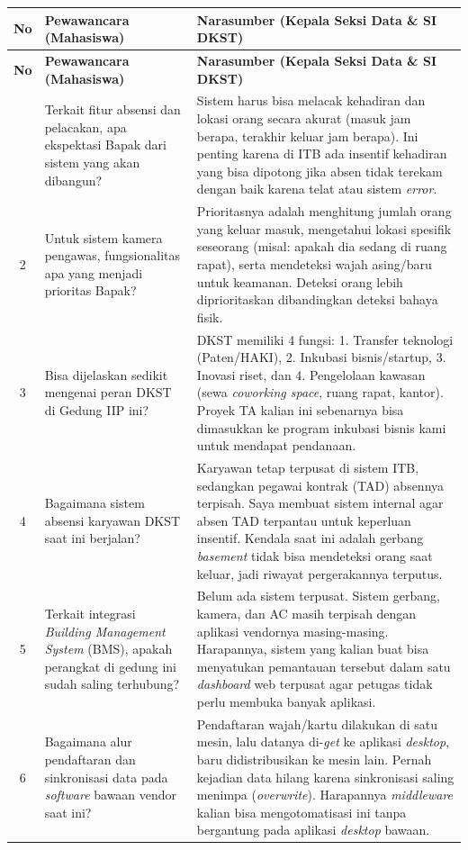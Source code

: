 \begin{longtable}{|c|p{}|p{}|}
\hline
\textbf{No} & \textbf{Pewawancara (Mahasiswa)} & \textbf{Narasumber (Kepala Seksi Data \& SI DKST)} \\ \hline
\endfirsthead
\hline
\textbf{No} & \textbf{Pewawancara (Mahasiswa)} & \textbf{Narasumber (Kepala Seksi Data \& SI DKST)} \\ \hline
\endhead
\hline
\endfoot
\hline
\endlastfoot
1 & Terkait fitur absensi dan pelacakan, apa ekspektasi Bapak dari sistem yang akan dibangun? & Sistem harus bisa melacak kehadiran dan lokasi orang secara akurat (masuk jam berapa, terakhir keluar jam berapa). Ini penting karena di ITB ada insentif kehadiran yang bisa dipotong jika absen tidak terekam dengan baik karena telat atau sistem \textit{error}. \\ \hline
2 & Untuk sistem kamera pengawas, fungsionalitas apa yang menjadi prioritas Bapak? & Prioritasnya adalah menghitung jumlah orang yang keluar masuk, mengetahui lokasi spesifik seseorang (misal: apakah dia sedang di ruang rapat), serta mendeteksi wajah asing/baru untuk keamanan. Deteksi orang lebih diprioritaskan dibandingkan deteksi bahaya fisik. \\ \hline
3 & Bisa dijelaskan sedikit mengenai peran DKST di Gedung IIP ini? & DKST memiliki 4 fungsi: 1. Transfer teknologi (Paten/HAKI), 2. Inkubasi bisnis/startup, 3. Inovasi riset, dan 4. Pengelolaan kawasan (sewa \textit{coworking space}, ruang rapat, kantor). Proyek TA kalian ini sebenarnya bisa dimasukkan ke program inkubasi bisnis kami untuk mendapat pendanaan. \\ \hline
4 & Bagaimana sistem absensi karyawan DKST saat ini berjalan? & Karyawan tetap terpusat di sistem ITB, sedangkan pegawai kontrak (TAD) absennya terpisah. Saya membuat sistem internal agar absen TAD terpantau untuk keperluan insentif. Kendala saat ini adalah gerbang \textit{basement} tidak bisa mendeteksi orang saat keluar, jadi riwayat pergerakannya terputus. \\ \hline
5 & Terkait integrasi \textit{Building Management System} (BMS), apakah perangkat di gedung ini sudah saling terhubung? & Belum ada sistem terpusat. Sistem gerbang, kamera, dan AC masih terpisah dengan aplikasi vendornya masing-masing. Harapannya, sistem yang kalian buat bisa menyatukan pemantauan tersebut dalam satu \textit{dashboard} web terpusat agar petugas tidak perlu membuka banyak aplikasi. \\ \hline
6 & Bagaimana alur pendaftaran dan sinkronisasi data pada \textit{software} bawaan vendor saat ini? & Pendaftaran wajah/kartu dilakukan di satu mesin, lalu datanya di-\textit{get} ke aplikasi \textit{desktop}, baru didistribusikan ke mesin lain. Pernah kejadian data hilang karena sinkronisasi saling menimpa (\textit{overwrite}). Harapannya \textit{middleware} kalian bisa mengotomatisasi ini tanpa bergantung pada aplikasi \textit{desktop} bawaan. \\ \hline

\end{longtable}
